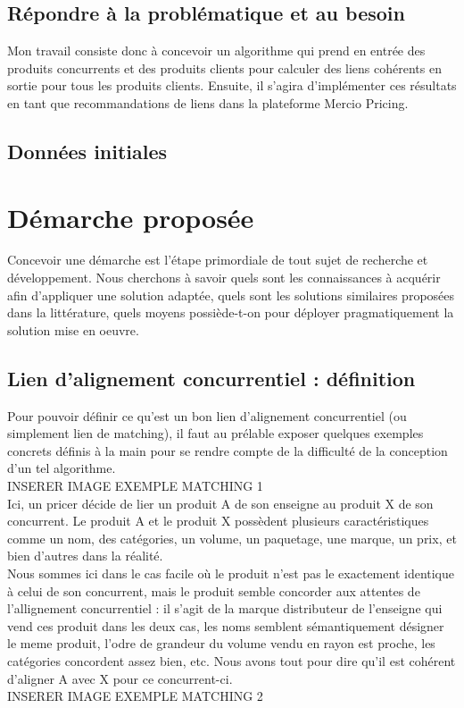 \documentclass{rapportCS}
\begin{document}
\subsection{Répondre à la problématique et au besoin}
Mon travail consiste donc à concevoir un algorithme qui prend en entrée des produits concurrents et 
des produits clients pour calculer des liens cohérents en sortie pour tous les produits clients.
Ensuite, il s'agira d'implémenter ces résultats en tant que recommandations de liens dans la
plateforme Mercio Pricing.\\

\subsection{Données initiales}

\newpage

\section{Démarche proposée}
Concevoir une démarche est l'étape primordiale de tout sujet de recherche et développement.
Nous cherchons à savoir quels sont les connaissances à acquérir afin d'appliquer une solution adaptée,
quels sont les solutions similaires proposées dans la littérature, quels moyens possiède-t-on pour
déployer pragmatiquement la solution mise en oeuvre.\\

\subsection{Lien d'alignement concurrentiel : définition}
Pour pouvoir définir ce qu'est un bon lien d'alignement concurrentiel (ou simplement lien de matching),
il faut au prélable exposer quelques exemples concrets définis à la main pour se rendre compte de la 
difficulté de la conception d'un tel algorithme. \\

INSERER IMAGE EXEMPLE MATCHING 1\\

Ici, un pricer décide de lier un produit A de son enseigne au produit X de son concurrent. 
Le produit A et le produit X possèdent plusieurs caractéristiques comme un nom, des catégories, un volume,
un paquetage, une marque, un prix, et bien d'autres dans la réalité.\\
Nous sommes ici dans le cas facile où le produit n'est pas le exactement identique à celui de son concurrent,
mais le produit semble concorder aux attentes de l'allignement concurrentiel : il s'agit de la marque distributeur
de l'enseigne qui vend ces produit dans les deux cas,
les noms semblent sémantiquement désigner le meme produit, l'odre de grandeur du volume vendu en rayon est proche,
les catégories concordent assez bien, etc.
Nous avons tout pour dire qu'il est cohérent d'aligner A avec X pour ce concurrent-ci. \\

INSERER IMAGE EXEMPLE MATCHING 2\\
\end{document}
